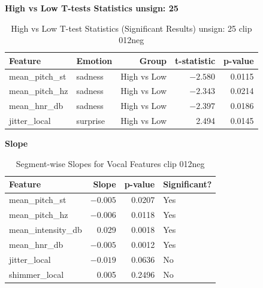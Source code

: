  
  \begin{table}[H]
    \centering
    \caption*{\textbf{High vs Low T-tests Statistics unsign: 25}}
    \begin{tabular}{llrrr}
      \toprule
      \textbf{Feature}         & \textbf{Emotion} & \textbf{Group}     & \textbf{t-statistic} & \textbf{p-value} \\
      \midrule
      mean\_pitch\_st          & sadness          & High vs Low        & $-2.580$             & 0.0115           \\
      mean\_pitch\_hz          & sadness          & High vs Low        & $-2.343$             & 0.0214           \\
      mean\_hnr\_db            & sadness          & High vs Low        & $-2.397$             & 0.0186           \\
      jitter\_local            & surprise         & High vs Low        & 2.494                & 0.0145           \\
      \bottomrule
    \end{tabular}
    \caption{High vs Low T-test Statistics (Significant Results) unsign: 25 clip 012neg}
    \label{tab:seghighlow_sad_surp_012}
  \end{table}
  

  \begin{table}[H]
    \centering
    \caption*{\textbf{Slope}}
 
    \begin{tabular}{lrrl}
      \toprule
      \textbf{Feature}         & \textbf{Slope}  & \textbf{p-value} & \textbf{Significant?} \\
      \midrule
      mean\_pitch\_st          & $-0.005$        & 0.0207           & Yes                   \\
      mean\_pitch\_hz          & $-0.006$        & 0.0118           & Yes                   \\
      mean\_intensity\_db      & 0.029           & 0.0018           & Yes                   \\
      mean\_hnr\_db            & $-0.005$        & 0.0012           & Yes                   \\
      jitter\_local            & $-0.019$        & 0.0636           & No                    \\
      shimmer\_local           & 0.005           & 0.2496           & No                    \\
      \bottomrule
    \end{tabular}
    \caption{Segment-wise Slopes for Vocal Features clip 012neg}
    \label{tab:segslope_012}
  \end{table}



